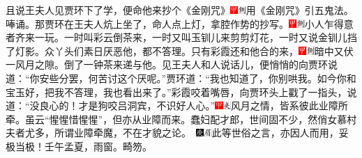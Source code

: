 且说王夫人见贾环下了学，便命他来抄个《金刚咒》{\includegraphics[width=3mm]{../Images/00002}\includegraphics[width=3mm]{../Images/00011}\footnotesize \kaishu 用《金刚咒》引五鬼法。}唪诵。那贾环在王夫人炕上坐了，命人点上灯，拿腔作势的抄写。{\includegraphics[width=3mm]{../Images/00002}\includegraphics[width=3mm]{../Images/00011}\footnotesize \kaishu 小人乍得意者齐来一玩。}一时叫彩云倒茶来，一时又叫玉钏儿来剪剪灯花，一时又说金钏儿挡了灯影。众丫头们素日厌恶他，都不答理。只有彩霞还和他合的来，{\includegraphics[width=3mm]{../Images/00002}\includegraphics[width=3mm]{../Images/00011}\footnotesize \kaishu 暗中又伏一风月之隙。}倒了一钟茶来递与他。见王夫人和人说话儿，便悄悄的向贾环说道：“你安些分罢，何苦讨这个厌呢。”贾环道：“我也知道了，你别哄我。如今你和宝玉好，把我不答理，我也看出来了。”彩霞咬着嘴唇，向贾环头上戳了一指头，说道：“没良心的！才是狗咬吕洞宾，不识好人心。”{\includegraphics[width=3mm]{../Images/00002}\includegraphics[width=3mm]{../Images/00012}\footnotesize \kaishu 风月之情，皆系彼此业障所牵。虽云“惺惺惜惺惺”，但亦从业障而来。蠢妇配才郎，世间固不少，然俏女慕村夫者尤多，所谓业障牵魔，不在才貌之论。　\includegraphics[width=3mm]{../Images/00004}\includegraphics[width=3mm]{../Images/00010}\footnotesize \kaishu 此等世俗之言，亦因人而用，妥极当极！壬午孟夏，雨窗。畸笏。}


